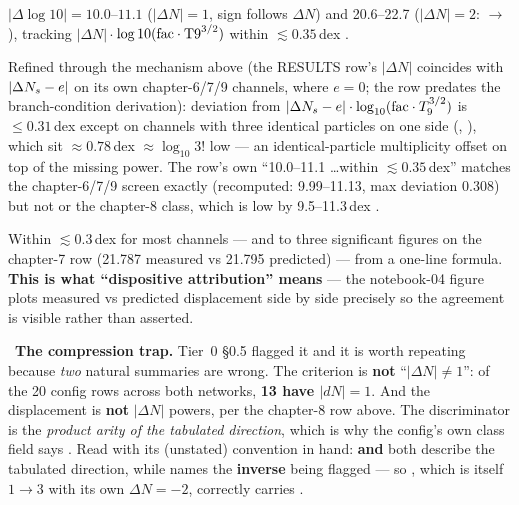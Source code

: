 \begin{result}
$|\Delta\log10| = 10.0$--$11.1$ ($|\Delta N| = 1$, sign follows $\Delta N$) and
20.6--22.7 ($|\Delta N| = 2$:  $\to$ ),
tracking $|\Delta N|$\,$\cdot$\,$\log10(\mathrm{fac}\cdot\mathrm{T9}^{3/2})$ within
${\lesssim}0.35$\,dex .
\end{result}

Refined through the mechanism above (the RESULTS row's $|\Delta N|$ coincides
with $|\Delta N_{s} - e|$ on its own chapter-6/7/9 channels, where $e = 0$; the row
predates the branch-condition derivation): deviation from
$|\Delta N_{s} - e|\cdot\log_{10}(\mathrm{fac}\cdot T_{9}^{3/2})$ is $\le 0.31$\,dex except on
channels with three identical particles on one side
(, ), which sit
${\approx}0.78$\,dex ${\approx}\log_{10}3!$ low --- an identical-particle
multiplicity offset on top of the missing power. The row's own
``10.0--11.1 \ldots within ${\lesssim}0.35$\,dex'' matches the 
chapter-6/7/9 screen exactly (recomputed: 9.99--11.13, max deviation 0.308) but
not  or the chapter-8 class, which is low by 9.5--11.3\,dex
. \derivedhere

Within ${\lesssim}0.3$\,dex for most channels --- and to three significant
figures on the chapter-7 row (21.787 measured vs 21.795 predicted) --- from a
one-line formula. \textbf{This is what ``dispositive attribution'' means} --- the
notebook-04 figure plots measured vs predicted displacement side by side
precisely so the agreement is visible rather than asserted.

\begin{warn}
\warnglyph{}~\textbf{The compression trap.} Tier~0 \S0.5 flagged it and it is
worth repeating because \emph{two} natural summaries are wrong. The criterion is
\textbf{not} ``$|\Delta N| \ne 1$'': of the 20 config rows across both networks,
\textbf{13 have $|dN| = 1$}. And the displacement is \textbf{not} $|\Delta N|$
powers, per the chapter-8 row above. The discriminator is the \emph{product
arity of the tabulated direction}, which is why the config's own class field
says . Read
 with its (unstated) convention
in hand:  \textbf{and}  both describe the tabulated
direction, while  names the \textbf{inverse} being flagged ---
so , which is itself $1 \to 3$ with its own
$\Delta N = -2$, correctly carries .
\end{warn}

